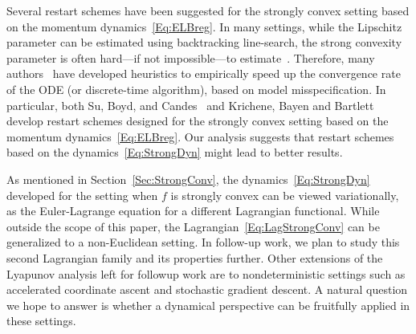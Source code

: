 \documentclass[11pt]{article}
\theoremstyle{plain}
\begin{document}
Several restart schemes have been suggested for the strongly convex setting based on the momentum dynamics~\eqref{Eq:ELBreg}. In many settings,  while the Lipschitz parameter can be estimated using backtracking line-search, the strong convexity parameter is often hard---if not impossible---to estimate~\cite{SuBoydCandes15}.  Therefore, many authors~\cite{ODonoghue15,SuBoydCandes15,Krichene15} have developed heuristics to empirically speed up the convergence rate of the ODE (or discrete-time algorithm), based on model misspecification. In particular, both Su, Boyd, and Candes~\cite{SuBoydCandes15} and Krichene, Bayen and Bartlett~\cite{Krichene15} develop restart schemes designed for the strongly convex setting based on the momentum dynamics~\eqref{Eq:ELBreg}. Our analysis suggests that restart schemes based on the dynamics~\eqref{Eq:StrongDyn} might lead to better results. 

As mentioned in Section~\ref{Sec:StrongConv}, the dynamics~\eqref{Eq:StrongDyn} developed for the setting when $f$ is strongly convex can be viewed variationally, as the Euler-Lagrange equation for a different Lagrangian functional. %
While outside the scope of this paper, the Lagrangian~\eqref{Eq:LagStrongConv} can be generalized to a non-Euclidean setting. In follow-up work, we plan to study this second Lagrangian family and its properties further. %
Other extensions of the Lyapunov analysis left for followup work are to nondeterministic settings such as accelerated coordinate ascent and stochastic gradient descent. A natural question we hope to answer is whether a dynamical perspective can be fruitfully applied in these settings. 
\end{document}
